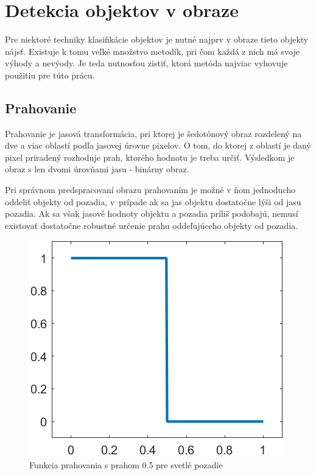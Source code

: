 \chapter{Detekcia objektov v obraze}

    Pre niektoré techniky klasifikácie objektov je nutné najprv v obraze tieto objekty nájsť. Existuje k tomu veľké množstvo metodík, pri čom každá z nich má svoje výhody a nevýody. Je teda nutnosťou zistiť, ktorá metóda najviac vyhovuje použitiu pre túto prácu.

\section{Prahovanie}

    Prahovanie je jasová transformácia, pri ktorej je šedotónový obraz rozdelený na dve a viac oblastí podľa jasovej úrovne pixelov. O tom, do ktorej z oblastí je daný pixel priradený rozhoduje prah, ktorého hodnotu je treba určiť. Výsledkom je obraz s len dvomi úrovňami jasu - binárny obraz.

    Pri správnom predspracovaní obrazu prahovaním je možné v ňom jednoducho oddeliť objekty od pozadia, v~prípade ak sa jas objektu dostatočne lýši od jasu pozadia. Ak sa však jasové hodnoty objektu a pozadia príliš podobajú, nemusí existovať dostatočne robustné určenie prahu oddeľujúceho objekty od pozadia. \cite{Morse1998/1} \cite{Buhl2023}

    \begin{figure}[!ht]
        \begin{center}
            \includegraphics[scale=.4]{obrazky/threshold/thresholding.png}
        \end{center}
        \caption{Funkcia prahovania s prahom 0.5 pre svetlé pozadie}
    \end{figure}

